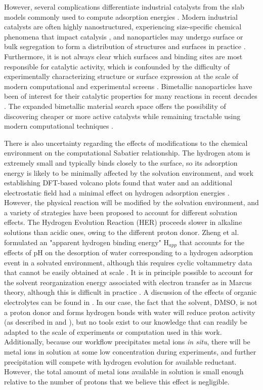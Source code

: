 \documentclass[preprint,12pt]{elsarticle}
\begin{document}
 However, several complications differentiate industrial catalysts from the slab models commonly used to compute adsorption energies \cite{norskov2005trends,tran2018active}. Modern industrial catalysts are often highly nanostructured, experiencing size-specific chemical phenomena that impact catalysis \cite{khorshidi2018strain}, and nanoparticles may undergo surface or bulk segregation to form a distribution of structures and surfaces in practice \cite{mitchell2021nanoscale,vallee2001size}. Furthermore, it is not always clear which surfaces and binding sites are most responsible for catalytic activity, which is confounded by the difficulty of experimentally characterizing structure or surface expression at the scale of modern computational and experimental screens \cite{yang2022applications}. Bimetallic nanoparticles have been of interest for their catalytic properties for many reactions in recent decades \cite{toshima1998bimetallic,singh2013synergistic}. The expanded bimetallic material search space offers the possibility of discovering cheaper or more active catalysts while remaining tractable using modern computational techniques \cite{tran2018active}.
 
 There is also uncertainty regarding the effects of modifications to the chemical environment on the computational Sabatier relationship. The hydrogen atom is extremely small and typically binds closely to the surface, so its adsorption energy is likely to be minimally affected by the solvation environment, and work establishing DFT-based volcano plots found that water and an additional electrostatic field had a minimal effect on hydrogen adsorption energies \cite{norskov2004origin}. However, the physical reaction will be modified by the solvation environment, and a variety of strategies have been proposed to account for different solvation effects. The Hydrogen Evolution Reaction (HER) proceeds slower in alkaline solutions than acidic ones, owing to the different proton donor. Zheng et al. formulated an "apparent hydrogen binding energy" H$_{app}$ that accounts for the effects of pH on the desorption of water corresponding to a hydrogen adsorption event in a solvated environment, although this requires cyclic voltammetry data that cannot be easily obtained at scale \cite{zheng2018perspective}. It is in principle possible to account for the solvent reorganization energy associated with electron transfer as in Marcus theory, although this is difficult in practice \cite{santos2012theory}. A discussion of the effects of organic electrolytes can be found in \cite{dubouis2019hydrogen}. In our case, the fact that the solvent, DMSO, is not a proton donor and forms hydrogen bonds with water will reduce proton activity (as described in \cite{liu2017effects} and \cite{nian2021designing}), but no tools exist to our knowledge that can readily be adapted to the scale of experiments or computation used in this work. Additionally, because our workflow precipitates metal ions \emph{in situ}, there will be metal ions in solution at some low concentration during experiments, and further precipitation will compete with hydrogen evolution for available reductant. However, the total amount of metal ions available in solution is small enough relative to the number of protons that we believe this effect is negligible.
 
\end{document}
